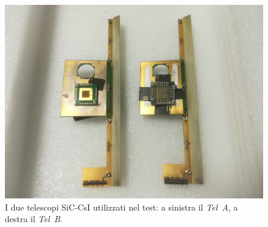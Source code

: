 \begin{figure} [!t]
	\centering
	\includegraphics[width=\textwidth, keepaspectratio]{Grafici/telescopi.jpg}
	\caption{I due telescopi SiC-CsI utilizzati nel test: a sinistra il \emph{Tel~A}, a destra il \emph{Tel~B}.} \label{fig:telescopi}
\end{figure}

\clearpage

\section{}

